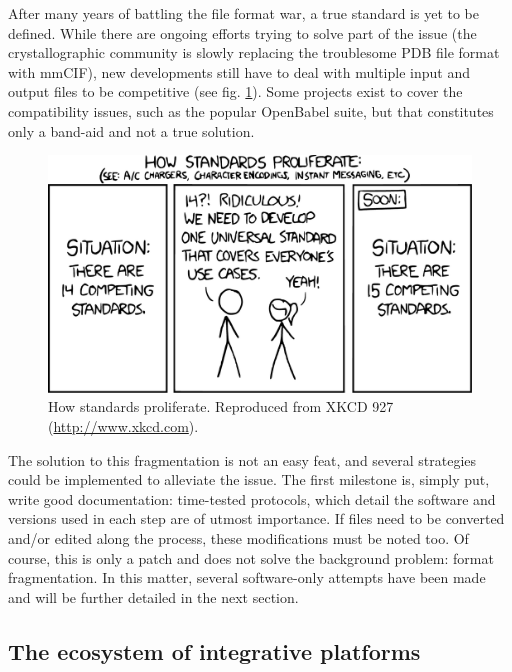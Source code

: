 After many years of battling the file format war, a true standard is yet to be defined. While there are ongoing efforts trying to solve part of the issue (the crystallographic community is slowly replacing the troublesome PDB file format with mmCIF\cite{bourne1997,berman2007}), new developments still have to deal with multiple input and output files to be competitive (see fig. \ref{fig:xkcd}). Some projects exist to cover the compatibility issues, such as the popular OpenBabel suite, \cite{oboyle2011} but that constitutes only a band-aid and not a true solution.

\begin{figure}[hbtp]
	\includegraphics[width=\textwidth]{./figures/01/xkcd927.pdf}
	\caption[Proliferation of standards]{How standards proliferate. Reproduced from XKCD 927 (\url{http://www.xkcd.com}).}
	\label{fig:xkcd}
\end{figure}


The solution to this fragmentation is not an easy feat, and several strategies could be implemented to alleviate the issue. The first milestone is, simply put, write good documentation: time-tested protocols, which detail the software and versions used in each step are of utmost importance. If files need to be converted and/or edited along the process, these modifications must be noted too. Of course, this is only a patch and does not solve the background problem: format fragmentation. In this matter, several software-only attempts have been made and will be further detailed in the next section.

\subsection{The ecosystem of integrative platforms}


